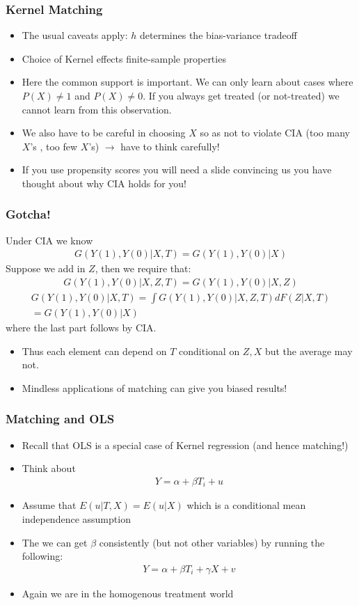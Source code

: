 \documentclass[xcolor=pdftex,dvipsnames,table,mathserif,aspectratio=169]{beamer}
\begin{document}
\begin{frame}
\frametitle{Kernel Matching}
\begin{itemize}
\item The usual caveats apply: $h$ determines the \alert{bias-variance} tradeoff
\item Choice of Kernel effects finite-sample properties
\item Here the \alert{common support} is important. We can only learn about cases where $P(X) \neq 1$ and $P(X) \neq 0$. If you always get treated (or not-treated) we cannot learn from this observation.
\item We also have to be careful in choosing $X$ so as not to violate CIA (too many $X$'s , too few $X$'s) $\rightarrow$ have to think carefully!
\item If you use propensity scores you will need a slide convincing us you have thought about why CIA holds for you!
\end{itemize}
\end{frame}



\begin{frame}
\frametitle{Gotcha!}
\small
Under CIA we know
\begin{eqnarray*}
G(Y(1),Y(0) | X, T) = G(Y(1),Y(0) | X)
\end{eqnarray*}
Suppose we add in $Z$, then we require that:
\begin{eqnarray*}
G(Y(1),Y(0) | X, Z, T) = G(Y(1),Y(0) | X, Z)
\end{eqnarray*}
\begin{eqnarray*}
G(Y(1),Y(0) | X, T) = \int G(Y(1),Y(0) | X, Z, T) dF(Z | X,T) \\
= G(Y(1),Y(0) | X)
\end{eqnarray*}
where the last part follows by CIA.
\begin{itemize}
\item Thus each element can depend on $T$ conditional on $Z,X$ but the average may not.
\item Mindless applications of matching can give you biased results!
\end{itemize}
\end{frame}


\begin{frame}
\frametitle{Matching and OLS}
\begin{itemize}
\item Recall that OLS is a special case of Kernel regression (and hence matching!)
\item Think about
\begin{eqnarray*}
Y  = \alpha + \beta T_i + u
\end{eqnarray*}
\item Assume that $E(u | T,X) = E(u | X)$ which is a conditional mean independence assumption
\item The we can get $\beta$ consistently (but not other variables) by running the following:
\begin{eqnarray*}
Y = \alpha + \beta T_i + \gamma X + v
\end{eqnarray*}
\item Again we are in the homogenous treatment world
\end{itemize}
\end{frame}
\end{document}
